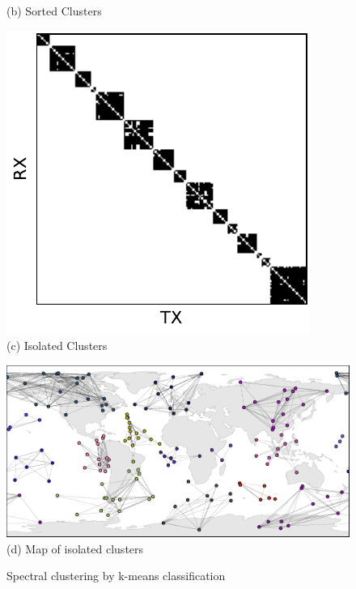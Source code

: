 \documentclass[conference]{IEEEtran}
\begin{document}
\begin{figure}[b!]
\begin{minipage}[b]{0.32\linewidth}
\begin{center}
      {\footnotesize(b) Sorted Clusters}
    \end{center}
  \end{minipage}
  \begin{minipage}[b]{0.32\linewidth}
    \begin{center}
      \includegraphics[width=\textwidth]{images/cluster_matrix.pdf} \\
      {\footnotesize(c) Isolated Clusters}
    \end{center}
  \end{minipage}
  \begin{minipage}[b]{\linewidth}
    \medskip
    \begin{center}
      \includegraphics[width=\textwidth]{images/clusters.pdf} \\
      {\footnotesize(d) Map of isolated clusters}
    \end{center}
  \end{minipage}
  \caption{Spectral clustering by k-means classification}
  \label{fig:clusters}
\end{figure}
\end{document}
